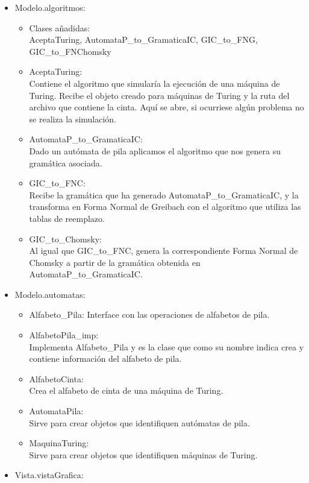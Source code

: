 \documentclass[12pt,a4paper,spanish]{book}
\begin{document}
\begin{itemize}
\item Modelo.algoritmos:
\begin{itemize}
\item Clases a\~nadidas:\\AceptaTuring, AutomataP\_to\_GramaticaIC, GIC\_to\_FNG, GIC\_to\_FNChomsky
\item AceptaTuring:\\Contiene el algoritmo que simular\'ia la ejecuci\'on de una m\'aquina de Turing. Recibe el objeto creado para m\'aquinas de Turing y la ruta del archivo que contiene la cinta. Aqu\'i se abre, si ocurriese alg\'un problema no se realiza la simulaci\'on.
\item AutomataP\_to\_GramaticaIC:\\Dado un aut\'omata de pila aplicamos el algoritmo que nos genera su gram\'atica asociada.
\item GIC\_to\_FNC:\\Recibe la gram\'atica que ha generado AutomataP\_to\_GramaticaIC, y la transforma en Forma Normal de Greibach con el algoritmo que utiliza las tablas de reemplazo.
\item GIC\_to\_Chomsky:\\Al igual que GIC\_to\_FNC, genera la correspondiente Forma Normal de Chomsky a partir de la gram\'atica obtenida en AutomataP\_to\_GramaticaIC.
\end{itemize}
\item Modelo.automatas:
\begin{itemize}
\item Alfabeto\_Pila: Interface con las operaciones de alfabetos de pila.
\item AlfabetoPila\_imp:\\Implementa Alfabeto\_Pila y es la clase que como su nombre indica crea y contiene informaci\'on del alfabeto de pila.
\item AlfabetoCinta:\\Crea el alfabeto de cinta de una m\'aquina de Turing.
\item AutomataPila:\\Sirve para crear objetos que identifiquen aut\'omatas de pila.
\item MaquinaTuring:\\Sirve para crear objetos que identifiquen m\'aquinas de Turing.
\end{itemize}
\item Vista.vistaGrafica:
\begin{itemize}

\end{itemize}
\end{itemize}
\end{document}
